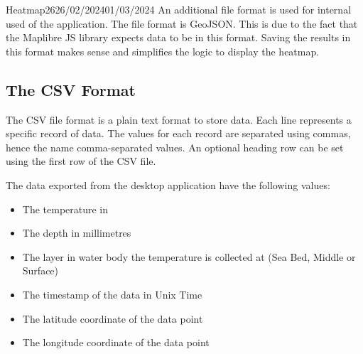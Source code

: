 \documentclass[12pt]{article}
\begin{document}
\begin{logbook-entry}{Heatmap}{26}{26/02/2024}{01/03/2024}
An additional file format is used for internal used of the application.
The file format is GeoJSON.
This is due to the fact that the Maplibre JS library expects data to be in this format.
Saving the results in this format makes sense and simplifies the logic to display the heatmap.

\subsection*{The CSV Format}

The CSV file format is a plain text format to store data.
Each line represents a specific record of data.
The values for each record are separated using commas, hence the name comma-separated values.
An optional heading row can be set using the first row of the CSV file.

The data exported from the desktop application have the following values:

\begin{itemize}
    \item The temperature in 
    \item The depth in millimetres
    \item The layer in water body the temperature is collected at (Sea Bed, Middle or Surface)
    \item The timestamp of the data in Unix Time
    \item The latitude coordinate of the data point
    \item The longitude coordinate of the data point
\end{itemize}
\end{logbook-entry}
\end{document}

